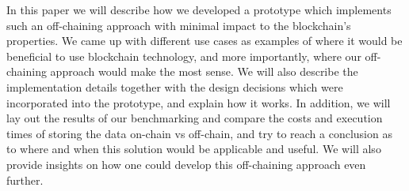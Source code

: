 In this paper we will describe how we developed a prototype which implements such an off-chaining approach with minimal impact to the blockchain’s properties. We came up with different use cases as examples of where it would be beneficial to use blockchain technology, and more importantly, where our off-chaining approach would make the most sense. We will also describe the implementation details together with the design decisions which were incorporated into the prototype, and explain how it works. In addition, we will lay out the results of our benchmarking and compare the costs and execution times of storing the data on-chain vs off-chain, and try to reach a conclusion as to where and when this solution would be applicable and useful. We will also provide insights on how one could develop this off-chaining approach even further.
